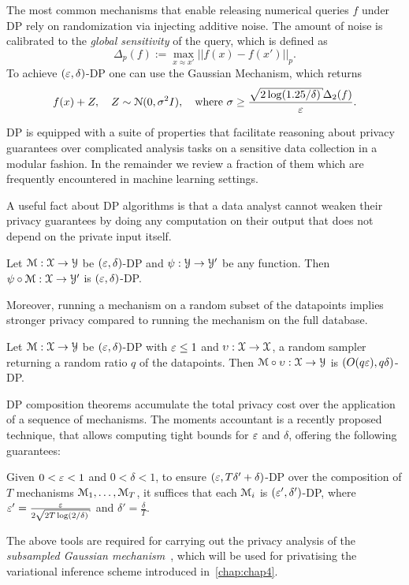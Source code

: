 The most common mechanisms that enable releasing numerical queries $f$ under DP rely on randomization via injecting additive noise. The amount of noise is calibrated to the \emph{global sensitivity} of the query, which is defined as 
\[
\Delta_p(f) := \underset{x \approx x'}{\max} ||f(x)-f(x')||_p.
\]
To achieve $(\varepsilon, \delta)$-DP one can use the Gaussian Mechanism, which returns
\[
f(x)+Z, \quad Z \sim \mcN(0, \sigma^2 I), \quad \text{where } \sigma \geq \frac{\sqrt{2\log(1.25/\delta)}\Delta_2(f)}{\veps}.
\]

DP is equipped with a suite of properties that facilitate reasoning about privacy guarantees over complicated analysis tasks on a sensitive data collection in a modular fashion. In the remainder we review a fraction of them which are frequently encountered in machine learning settings.

A useful fact about DP algorithms is that a data analyst cannot weaken their privacy guarantees by doing any computation on their output that does not depend on the private input itself.

	Let $ {\mathcal{M}: \mathcal{X} \rightarrow \mathcal{Y}}$ be $(\varepsilon, \delta)$-DP and $\psi:\mathcal{Y} \rightarrow \mathcal{Y}'$ be any function. Then $\psi \circ \mathcal{M}: \mathcal{X} \rightarrow \mathcal{Y}'$ is $(\varepsilon, \delta)$-DP.
	\label{prop:bdp-postprocessing}
\enprop

Moreover, running a mechanism on a random subset of the datapoints implies stronger privacy compared to running the mechanism on the full database.

Let $ \mathcal{M}: \mathcal{X} \rightarrow \mathcal{Y}$ be $(\varepsilon, \delta)$-DP with $\varepsilon \leq 1$ and $\upsilon: \mathcal{X} \rightarrow \mathcal{X}$, a random sampler returning a random ratio $q$ of the datapoints. Then $\mathcal{M} \circ \upsilon: \mathcal{X} \rightarrow \mathcal{Y}$ is $(O(q\varepsilon), q\delta)$-DP.
\label{prop:bdp-sampling}
\enprop

DP composition theorems accumulate the total privacy cost over the application of a sequence of mechanisms. The moments accountant is a recently proposed technique, that allows computing tight bounds for $\varepsilon$ and $\delta$, offering the following guarantees:

Given $0<\varepsilon<1$ and $0<\delta<1$, to ensure $(\varepsilon, T\delta'+\delta)$-DP over the composition of $T$ mechanisms $\mathcal{M}_1,\ldots,\mathcal{M}_T$, it suffices that each $\mathcal{M}_i$ is $(\varepsilon', \delta')$-DP, where $\veps'=\frac{\veps}{2\sqrt{2T\log(2/\delta)}}$ and $\delta'=\frac{\delta}{T}$. 
\label{prop:bmoments-accountant}
\enprop

The above tools are required for carrying out the privacy analysis of the \emph{subsampled Gaussian mechanism}~\citep{abadi16}, which will be used for privatising the variational inference scheme introduced in~\cref{chap:chap4}.




